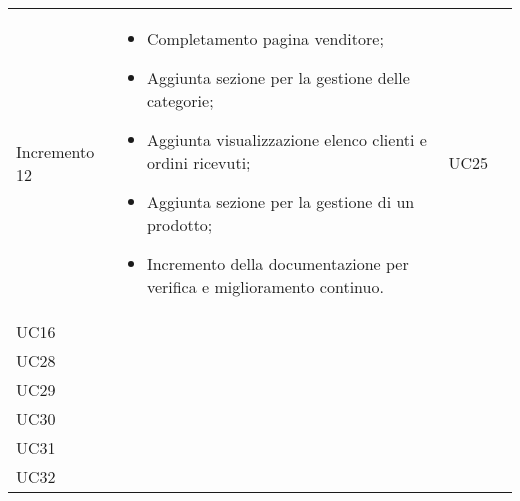 \begin{longtable}{
    >{\centering}p{}
    >{\raggedright}p{}
    >{\centering}p{}
    >{\centering}p{}
    }
    \tabularnewline
    Incremento 12                 & \vspace{-15px}
    \begin{itemize}
        \renewcommand\labelitemi{-}
        \item Completamento pagina venditore;
        \item Aggiunta sezione per la gestione delle categorie;
        \item Aggiunta visualizzazione elenco clienti e ordini ricevuti;
        \item Aggiunta sezione per la gestione di un prodotto;
        \item Incremento della documentazione per verifica e miglioramento continuo.
    \end{itemize}     & UC25                                                                                                                                                                                     \\ UC16 \\ UC28 \\ UC29 \\ UC30 \\ UC31 \\ UC32 &
    \tabularnewline
\end{longtable}
\renewcommand{\arraystretch}{1}

